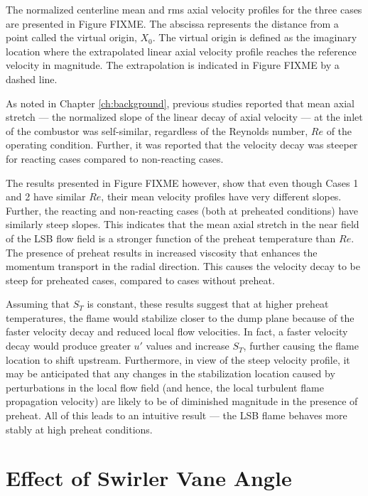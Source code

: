 The normalized centerline mean and rms axial velocity profiles for the three cases are presented in Figure FIXME.
The abscissa represents the distance from a point called the virtual origin, \(X_0\).
The virtual origin is defined as the imaginary location where the extrapolated linear axial velocity profile reaches the reference velocity in magnitude.
The extrapolation is indicated in Figure FIXME by a dashed line.

As noted in Chapter \ref{ch:background}, previous studies\cite{2008-cheng-a} reported that mean axial stretch --- the normalized slope of the linear decay of axial velocity --- at the inlet of the combustor was self-similar, regardless of the Reynolds number, \(Re\) of the operating condition.
Further, it was reported that the velocity decay was steeper for reacting cases compared to non-reacting cases.

The results presented in Figure FIXME however, show that even though Cases 1 and 2 have similar \(Re\), their mean velocity profiles have very different slopes.
Further, the reacting and non-reacting cases (both at preheated conditions) have similarly steep slopes.
This indicates that the mean axial stretch in the near field of the LSB flow field is a stronger function of the preheat temperature than \(Re\).
The presence of preheat results in increased viscosity that enhances the momentum transport in the radial direction.
This causes the velocity decay to be steep for preheated cases, compared to cases without preheat.

Assuming that \(S_T\) is constant, these results suggest that at higher preheat temperatures, the flame would stabilize closer to the dump plane because of the faster velocity decay and reduced local flow velocities.
In fact, a faster velocity decay would produce greater \(u'\) values and increase \(S_T\), further causing the flame location to shift upstream.
Furthermore, in view of the steep velocity profile, it may be anticipated that any changes in the stabilization location caused by perturbations in the local flow field (and hence, the local turbulent flame propagation velocity) are likely to be of diminished magnitude in the presence of preheat.
All of this leads to an intuitive result --- the LSB flame behaves more stably at high preheat conditions.

\section{Effect of Swirler Vane Angle}
\label{sec:lsb-effect-of-swirler-vane-angle}

